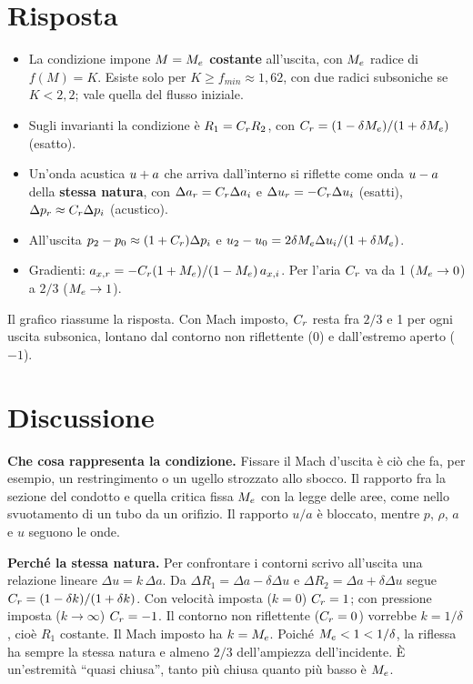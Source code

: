 \section*{Risposta}
\begin{itemize}
  \item La condizione impone \textbf{$M=M_e$ costante} all'uscita, con $M_e$ radice di $f(M)=K$. Esiste solo per
        $K\ge f_{min}\approx1{,}62$, con due radici subsoniche se $K<2{,}2$; vale quella del flusso iniziale.
  \item Sugli invarianti la condizione è $R_1=C_r R_2$, con $C_r=(1-\delta M_e)/(1+\delta M_e)$ (esatto).
  \item Un'onda acustica $u+a$ che arriva dall'interno si riflette come onda $u-a$ della \textbf{stessa natura}, con
        $\Delta a_r=C_r\Delta a_i$ e $\Delta u_r=-C_r\Delta u_i$ (esatti), $\Delta p_r\approx C_r\Delta p_i$ (acustico).
  \item All'uscita $p_2-p_0\approx(1+C_r)\Delta p_i$ e $u_2-u_0=2\delta M_e\Delta u_i/(1+\delta M_e)$.
  \item Gradienti: $a_{x,r}=-C_r(1+M_e)/(1-M_e)\,a_{x,i}$. Per l'aria $C_r$ va da 1 ($M_e\to0$) a $2/3$ ($M_e\to1$).
\end{itemize}


Il grafico riassume la risposta. Con Mach imposto, $C_r$ resta fra $2/3$ e 1 per ogni uscita subsonica, lontano dal
contorno non riflettente (0) e dall'estremo aperto ($-1$).

\section*{Discussione}
\textbf{Che cosa rappresenta la condizione.} Fissare il Mach d'uscita è ciò che fa, per esempio, un restringimento o
un ugello strozzato allo sbocco. Il rapporto fra la sezione del condotto e quella critica fissa $M_e$ con la legge
delle aree, come nello svuotamento di un tubo da un orifizio. Il rapporto $u/a$ è bloccato, mentre $p$, $\rho$, $a$ e
$u$ seguono le onde.

\textbf{Perché la stessa natura.} Per confrontare i contorni scrivo all'uscita una relazione lineare
$\Delta u=k\,\Delta a$. Da $\Delta R_1=\Delta a-\delta\Delta u$ e $\Delta R_2=\Delta a+\delta\Delta u$ segue
$C_r=(1-\delta k)/(1+\delta k)$. Con velocità imposta ($k=0$) $C_r=1$; con pressione imposta ($k\to\infty$) $C_r=-1$.
Il contorno non riflettente ($C_r=0$) vorrebbe $k=1/\delta$, cioè $R_1$ costante. Il Mach imposto ha $k=M_e$. Poiché
$M_e<1<1/\delta$, la riflessa ha sempre la stessa natura e almeno $2/3$ dell'ampiezza dell'incidente. È un'estremità
``quasi chiusa'', tanto più chiusa quanto più basso è $M_e$.

